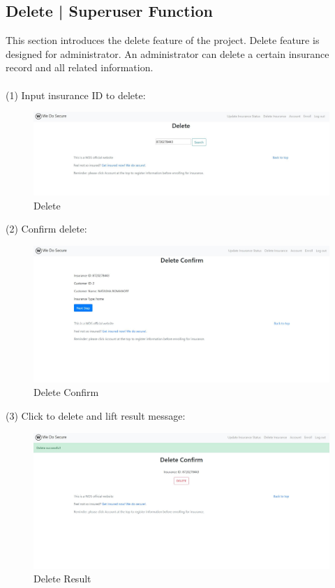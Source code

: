\documentclass[12pt]{article}
\begin{document}
	\subsection{Delete | Superuser Function}
	This section introduces the delete feature of the project. Delete feature is designed for administrator. An administrator can delete a certain insurance record and all related information.\\\\
	\noindent (1) Input insurance ID to delete:
	\begin{figure}[H]
		\centering
		\includegraphics[scale=0.38]{delete}
		\caption{Delete}
	\end{figure}
    \newpage
    \noindent (2) Confirm delete:
	\begin{figure}[H]
		\centering
		\includegraphics[scale=0.38]{deleteconfirm}
		\caption{Delete Confirm}
	\end{figure}
	\noindent (3) Click to delete and lift result message:
	\begin{figure}[H]
		\centering
		\includegraphics[scale=0.38]{deleteresult}
		\caption{Delete Result}
	\end{figure}
	
\end{document}
